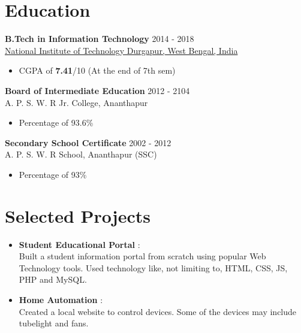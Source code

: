 \documentclass[margin, centered]{res}
\begin{document}
\begin{resume}

\section{Education}
\textbf{B.Tech in Information Technology} \hfill 2014 - 2018 \\
\href{http://nitdgp.ac.in/}{National Institute of Technology Durgapur, West Bengal, India}
\begin{itemize}
 \item CGPA of \textbf{7.41}/10 (At the end of 7th sem)
\end{itemize}
\textbf{Board of Intermediate Education} \hfill 2012 - 2104 \\
A. P. S. W. R Jr. College, Ananthapur
\begin{itemize}
 \item Percentage of 93.6\%
\end{itemize}
\textbf{Secondary School Certificate} \hfill 2002 - 2012 \\
A. P. S. W. R School, Ananthapur (SSC) 
\begin{itemize}
 \item Percentage of 93\%
\end{itemize}

\section{Selected Projects}
\begin{itemize}[leftmargin=*]
 \item \textbf{Student Educational Portal} :\\
    Built a student information portal from scratch using popular Web Technology tools. Used technology like, not limiting to, HTML, CSS, JS, PHP and MySQL.
 \item \textbf{Home Automation} :\\
    Created a local website to control devices. Some of the devices may include tubelight and fans.
\end{itemize}


\end{resume}
\end{document}
